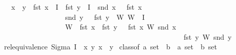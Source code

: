 \documentclass[12pt]{scrartcl}
\begin{document}
\begin{isabelle}
\ \ \ {\isachardoublequoteopen}x\ {\isasymsim}\ y\ {\isasymequiv}\ {\isacharparenleft}{\kern0pt}fst\ x\ {\isasymin}\ I\ {\isasymand}\ fst\ y\ {\isasymin}\ I{\isacharparenright}{\kern0pt}\ {\isasymand}\ {\isacharparenleft}{\kern0pt}snd\ x\ {\isasymin}\ {\isasymFF}\ {\isacharparenleft}{\kern0pt}fst\ x{\isacharparenright}{\kern0pt}\ \isanewline
\ \ \ \ \ \ \ \ \ \ \ \ \ \ \ \ \ {\isasymand}\ snd\ y\ {\isasymin}\ {\isasymFF}\ {\isacharparenleft}{\kern0pt}fst\ y{\isacharparenright}{\kern0pt}{\isacharparenright}{\kern0pt}\ {\isasymand}\ {\isacharparenleft}{\kern0pt}{\isasymexists}W{\isachardot}{\kern0pt}\ {\isacharparenleft}{\kern0pt}W\ {\isasymin}\ I{\isacharparenright}{\kern0pt}\ \isanewline
\ \ \ \ \ \ \ \ \ \ \ \ \ \ \ \ \ {\isasymand}\ {\isacharparenleft}{\kern0pt}W\ {\isasymsubseteq}\ fst\ x\ {\isasyminter}\ fst\ y{\isacharparenright}{\kern0pt}\ {\isasymand}\ {\isasymrho}\ {\isacharparenleft}{\kern0pt}fst\ x{\isacharparenright}{\kern0pt}\ W\ {\isacharparenleft}{\kern0pt}snd\ x{\isacharparenright}{\kern0pt}\ \isanewline
\ \ \ \ \ \ \ \ \ \ \ \ \ \ \ \ \ \ \ \ \ \ \ \ \ \ \ \ \ \ \ \ \ \ \ \ \ \ \ \ \ \ \ \ \ \ \ \ \ {\isacharequal}{\kern0pt}\ {\isasymrho}\ {\isacharparenleft}{\kern0pt}fst\ y{\isacharparenright}{\kern0pt}\ W\ {\isacharparenleft}{\kern0pt}snd\ y{\isacharparenright}{\kern0pt}{\isacharparenright}{\kern0pt}{\isachardoublequoteclose}\isanewline
\isanewline
{}\isamarkupfalse%
\ rel{\isacharcolon}{\kern0pt}equivalence\ {\isachardoublequoteopen}{\isacharparenleft}{\kern0pt}Sigma\ I\ {\isasymFF}{\isacharparenright}{\kern0pt}{\isachardoublequoteclose}\ {\isachardoublequoteopen}{\isacharbraceleft}{\kern0pt}{\isacharparenleft}{\kern0pt}x{\isacharcomma}{\kern0pt}\ y{\isacharparenright}{\kern0pt}{\isachardot}{\kern0pt}\ x\ {\isasymsim}\ y{\isacharbraceright}{\kern0pt}{\isachardoublequoteclose}\isanewline
\isanewline
{}\isamarkupfalse%
\ class{\isacharunderscore}{\kern0pt}of{\isacharcolon}{\kern0pt}{\isacharcolon}{\kern0pt}\ {\isachardoublequoteopen}{\isacharprime}{\kern0pt}a\ set\ {\isasymRightarrow}\ {\isacharprime}{\kern0pt}b\ {\isasymRightarrow}\ {\isacharparenleft}{\kern0pt}{\isacharprime}{\kern0pt}a\ set\ {\isasymtimes}\ {\isacharprime}{\kern0pt}b{\isacharparenright}{\kern0pt}\ set{\isachardoublequoteclose}\ {\isacharparenleft}{\kern0pt}{\isachardoublequoteopen}{\isasymlfloor}{\isacharparenleft}{\kern0pt}{\isacharunderscore}{\kern0pt}{\isacharcomma}{\kern0pt}{\isacharslash}{\kern0pt}\ {\isacharunderscore}{\kern0pt}{\isacharparenright}{\kern0pt}{\isasymrfloor}{\isachardoublequoteclose}{\isacharparenright}{\kern0pt}\isanewline

\end{isabelle}
\end{document}
